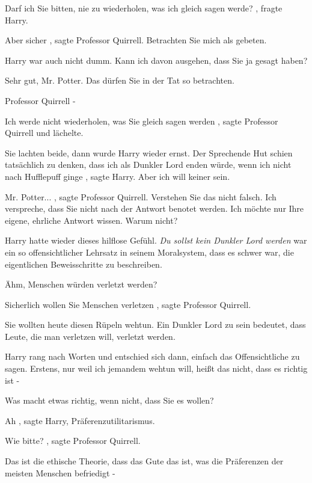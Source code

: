\glqq Darf ich Sie bitten, nie zu wiederholen, was ich gleich sagen
werde?\grqq{} , fragte Harry.

\glqq Aber sicher\grqq{} , sagte Professor Quirrell. \glqq Betrachten Sie mich
als gebeten.\grqq{}

Harry war auch nicht dumm. \glqq Kann ich davon ausgehen, dass Sie ja gesagt
haben?\grqq{}

\glqq Sehr gut, Mr. Potter. Das dürfen Sie in der Tat so betrachten.\grqq{}

\glqq Professor Quirrell -\grqq{}

\glqq Ich werde nicht wiederholen, was Sie gleich sagen werden\grqq{} , sagte
Professor Quirrell und lächelte.

Sie lachten beide, dann wurde Harry wieder ernst. \glqq Der Sprechende Hut
schien tatsächlich zu denken, dass ich als Dunkler Lord enden würde, wenn ich
nicht nach Hufflepuff ginge\grqq{} , sagte Harry. \glqq Aber ich will keiner
sein.\grqq{}

\glqq Mr. Potter...\grqq{} , sagte Professor Quirrell. \glqq Verstehen Sie das
nicht falsch. Ich verspreche, dass Sie nicht nach der Antwort benotet werden.
Ich möchte nur Ihre eigene, ehrliche Antwort wissen. Warum nicht?\grqq{}

Harry hatte wieder dieses hilflose Gefühl. \emph{Du sollst kein Dunkler Lord
werden} war ein so offensichtlicher Lehrsatz in seinem Moralsystem, dass es
schwer war, die eigentlichen Beweisschritte zu beschreiben.

\glqq Ähm, Menschen würden verletzt werden?\grqq{}

\glqq Sicherlich wollen Sie Menschen verletzen\grqq{} , sagte Professor
Quirrell.

\glqq Sie wollten heute diesen Rüpeln wehtun. Ein Dunkler Lord zu sein bedeutet,
dass Leute, die man verletzen will, verletzt werden.\grqq{}

Harry rang nach Worten und entschied sich dann, einfach das Offensichtliche zu
sagen. \glqq Erstens, nur weil ich jemandem wehtun will, heißt das nicht, dass
es richtig ist -\grqq{}

\glqq Was macht etwas richtig, wenn nicht, dass Sie es wollen?\grqq{}

\glqq Ah\grqq{} , sagte Harry, \glqq Präferenzutilitarismus.\grqq{}

\glqq Wie bitte?\grqq{} , sagte Professor Quirrell.

\glqq Das ist die ethische Theorie, dass das Gute das ist, was die Präferenzen
der meisten Menschen befriedigt -\grqq{}

